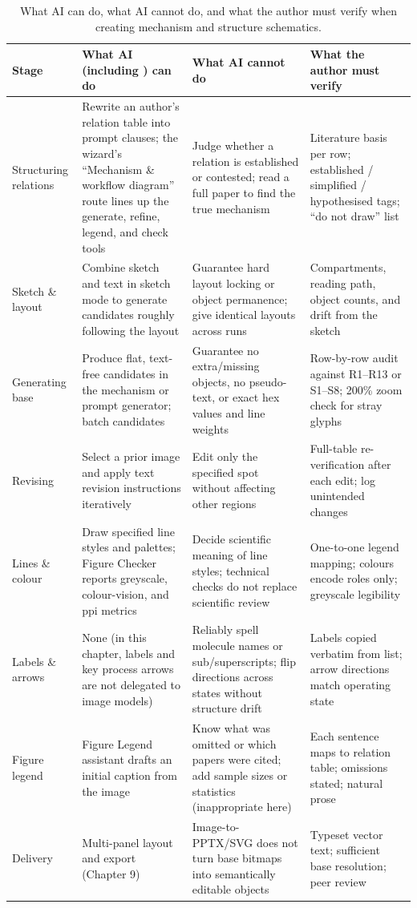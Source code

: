 \begin{table}[htbp]\centering\scriptsize
\setlength{\tabcolsep}{3pt}
\renewcommand{\arraystretch}{1.1}
\caption{What AI can do, what AI cannot do, and what the author must verify when creating mechanism and structure schematics.}\label{tab:ch07-02}
\begin{tabularx}{\linewidth}{lYYY}
\toprule
\textbf{Stage} & \textbf{What AI (including \scidraw{}) can do} & \textbf{What AI cannot do} & \textbf{What the author must verify} \\
\midrule
Structuring relations & Rewrite an author's relation table into prompt clauses; the wizard's ``Mechanism \& workflow diagram'' route lines up the generate, refine, legend, and check tools & Judge whether a relation is established or contested; read a full paper to find the true mechanism & Literature basis per row; established / simplified / hypothesised tags; ``do not draw'' list \\
Sketch \& layout & Combine sketch and text in sketch mode to generate candidates roughly following the layout & Guarantee hard layout locking or object permanence; give identical layouts across runs & Compartments, reading path, object counts, and drift from the sketch \\
Generating base & Produce flat, text-free candidates in the mechanism or prompt generator; batch candidates & Guarantee no extra/missing objects, no pseudo-text, or exact hex values and line weights & Row-by-row audit against R1--R13 or S1--S8; 200\% zoom check for stray glyphs \\
Revising & Select a prior image and apply text revision instructions iteratively & Edit only the specified spot without affecting other regions & Full-table re-verification after each edit; log unintended changes \\
Lines \& colour & Draw specified line styles and palettes; Figure Checker reports greyscale, colour-vision, and ppi metrics & Decide scientific meaning of line styles; technical checks do not replace scientific review & One-to-one legend mapping; colours encode roles only; greyscale legibility \\
Labels \& arrows & None (in this chapter, labels and key process arrows are not delegated to image models) & Reliably spell molecule names or sub/superscripts; flip directions across states without structure drift & Labels copied verbatim from list; arrow directions match operating state \\
Figure legend & Figure Legend assistant drafts an initial caption from the image & Know what was omitted or which papers were cited; add sample sizes or statistics (inappropriate here) & Each sentence maps to relation table; omissions stated; natural prose \\
Delivery & Multi-panel layout and export (Chapter 9) & Image-to-PPTX/SVG does not turn base bitmaps into semantically editable objects & Typeset vector text; sufficient base resolution; peer review \\
\bottomrule
\end{tabularx}
\end{table}

